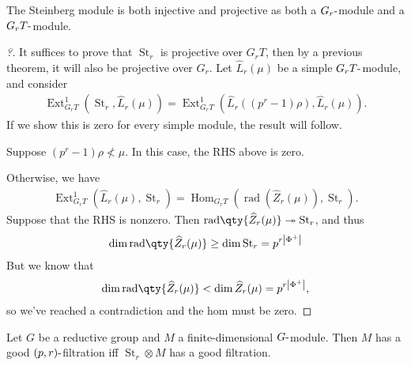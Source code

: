 \begin{theorem}[?]

The Steinberg module is both injective and projective as both a
\(G_r{\hbox{-}}\)module and a \(G_rT{\hbox{-}}\)module.

\end{theorem}

\begin{proof}[?]

It suffices to prove that \(\operatorname{St}_r\) is projective over
\(G_r T\), then by a previous theorem, it will also be projective over
\(G_r\). Let \(\widehat{L}_r(\mu)\) be a simple
\(G_rT{\hbox{-}}\)module, and consider
\begin{align*}  
\operatorname{Ext}_{G_rT}^1(\operatorname{St}_r, \widehat{L}_r(\mu)) =
\operatorname{Ext}_{G_rT}^1(\widehat{L}_r((p^r-1)\rho), \widehat{L}_r(\mu))
.\end{align*}
If we show this is zero for every simple module, the result will follow.

Suppose \((p^r-1)\rho\not< \mu\). In this case, the RHS above is zero.


Otherwise, we have
\begin{align*}  
\operatorname{Ext}_{G_rT}^1(\widehat{L}_r(\mu), \operatorname{St}_r) =
{\operatorname{Hom}}_{G_rT}({\operatorname{rad}}(\widehat{Z}_r(\mu)) , \operatorname{St}_r)
.\end{align*}
Suppose that the RHS is nonzero. Then
\({\operatorname{rad}}\qty{\widehat{Z}_r(\mu)} \twoheadrightarrow\operatorname{St}_r\),
and thus
\begin{align*}
\dim {\operatorname{rad}}\qty{ \widehat{Z}_r(\mu) } \geq \dim \operatorname{St}_r = p^{r{\left\lvert {\Phi^+} \right\rvert}}
\end{align*}
But we know that
\begin{align*}
\dim {\operatorname{rad}}\qty{\widehat{Z}_r(\mu)} < \dim \widehat{Z}_r(\mu) = p^{r{\left\lvert {\Phi^+} \right\rvert}}
,\end{align*}
so we've reached a contradiction and the hom must be zero.

\end{proof}

\begin{proposition}

Let \(G\) be a reductive group and \(M\) a finite-dimensional
\(G{\hbox{-}}\)module. Then \(M\) has a good
\((p, r){\hbox{-}}\)filtration iff \(\operatorname{St}_r \otimes M\) has
a good filtration.

\end{proposition}

